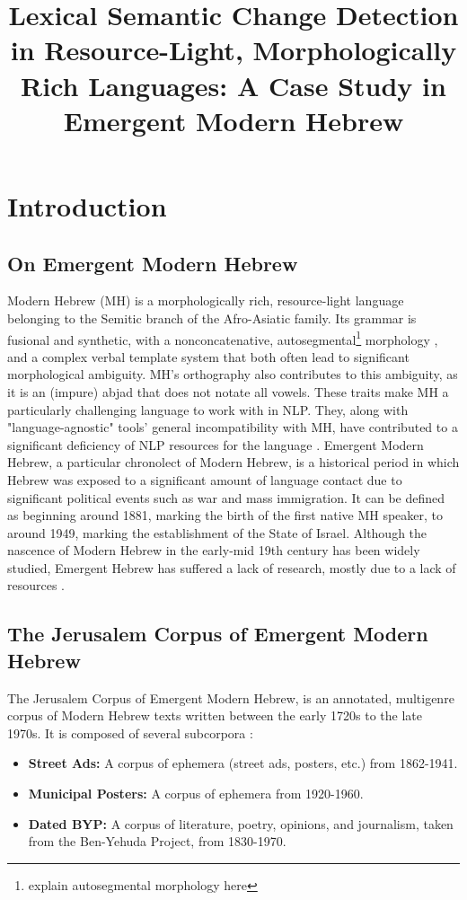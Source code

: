 \documentclass[10pt, a4paper]{article}
\title{\vspace*{.5\baselineskip} \textbf{Lexical Semantic Change Detection in Resource-Light, Morphologically Rich Languages: A Case Study in Emergent Modern Hebrew}}
\begin{document}
\maketitleabstract

\section{Introduction}

\subsection{On Emergent Modern Hebrew}
Modern Hebrew (MH) is a morphologically rich, resource-light language belonging to the Semitic branch of the Afro-Asiatic family. Its grammar is fusional and synthetic, with a nonconcatenative, autosegmental\footnote{explain autosegmental morphology here} morphology \cite{nonlinearmorphology}, and a complex verbal template system that both often lead to significant morphological ambiguity. MH's orthography also contributes to this ambiguity, as it is an (impure) abjad that does not notate all vowels.
These traits make MH a particularly challenging language to work with in NLP. They, along with "language-agnostic" tools' general incompatibility with MH, have contributed to a significant deficiency of NLP resources for the language \cite{tsarfaty2019whats}.
Emergent Modern Hebrew, a particular chronolect of Modern Hebrew, is a historical period in which Hebrew was exposed to a significant amount of language contact due to significant political events such as war and mass immigration. It can be defined as beginning around 1881, marking the birth of the first native MH speaker, to around 1949, marking the establishment of the State of Israel. Although the nascence of Modern Hebrew in the early-mid 19th century has been widely studied, Emergent Hebrew has suffered a lack of research, mostly due to a lack of resources \cite{Rubinstein2019}.

\subsection{The Jerusalem Corpus of Emergent Modern Hebrew}
The Jerusalem Corpus of Emergent Modern Hebrew, is an annotated, multigenre corpus of Modern Hebrew texts written between the early 1720s to the late 1970s. It is composed of several subcorpora \cite{Rubinstein2019}:
\begin{itemize}
    \item \textbf{Street Ads:} A corpus of ephemera (street ads, posters, etc.) from 1862-1941.
    \item \textbf{Municipal Posters:} A corpus of ephemera from 1920-1960.
    \item \textbf{Dated BYP:} A corpus of literature, poetry, opinions, and journalism, taken from the Ben-Yehuda Project, from 1830-1970.
\end{itemize}
\end{document}
